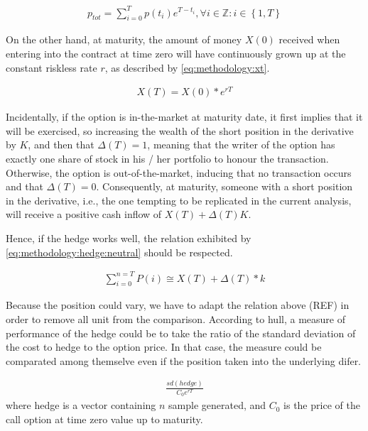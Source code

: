 \documentclass[12pt]{report}
\begin{document}
\begin{align}
  p_{tot} = \sum_{i = 0}^T p(t_i) e^{T-t_i} ,
  \forall i \in \mathbb{Z} : i \in \left \{1, T \right \}
  \label{methodology:porfolio:cost:tot}
\end{align}

On the other hand, at maturity, the amount of money $X(0)$ received when entering into the contract at time zero will have continuously grown up at the constant riskless rate $r$, as described by \cref{eq:methodology:xt}.

\begin{align}
  X(T) = X(0) * e^{rT} \label{eq:methodology:xt}
\end{align}

Incidentally, if the option is in-the-market at  maturity date, it first implies that it will be exercised, so increasing the wealth of the short position in the derivative by $K$, and then that $\Delta(T) = 1$, meaning that the writer of the option has exactly one share of stock in his / her portfolio to honour the transaction.
Otherwise, the option is out-of-the-market, inducing that no transaction occurs and that $\Delta(T) = 0$.
Consequently, at maturity, someone with a short position in the derivative, i.e., the one tempting to be replicated in the current analysis, will receive a positive cash inflow of $X(T) + \Delta(T) K$.

Hence, if the hedge works well, the relation exhibited by \ref{eq:methodology:hedge:neutral} should be respected.

\begin{align}
 \sum_{i = 0}^{n = T} P(i) \cong X(T) + \Delta(T) * k \label{eq:methodology:hedge:neutral}
\end{align}

Because the position could vary, we have to adapt the relation above (REF) in order to remove all unit from the comparison.
According to hull, a measure of performance of the hedge could be to take the ratio of the standard deviation of the cost to hedge to the option price. In that case, the measure could be comparated among themselve even if the position taken into the underlying difer.

\begin{align}
  \frac{sd(hedge)}{C_0 e ^{r T}}
  \label{bsm:delta:hedge:perf}
\end{align}
where hedge is a vector containing $n$ sample generated, and $C_0$ is the price of the call option at time zero value up to maturity.































\end{document}

